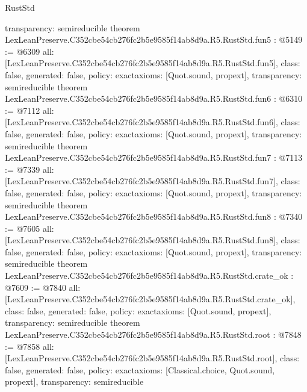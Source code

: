 \begin{lexlean}{RustStd}
\begin{coremodule}
{  transparency: semireducible
}
theorem LexLeanPreserve.C352cbe54cb276fc2b5e9585f14ab8d9a.R5.RustStd.fun5 : @5149 := @6309 {
  all: [LexLeanPreserve.C352cbe54cb276fc2b5e9585f14ab8d9a.R5.RustStd.fun5],
  class: false,
  generated: false,
  policy: exact{axioms: [Quot.sound, propext]},
  transparency: semireducible
}
theorem LexLeanPreserve.C352cbe54cb276fc2b5e9585f14ab8d9a.R5.RustStd.fun6 : @6310 := @7112 {
  all: [LexLeanPreserve.C352cbe54cb276fc2b5e9585f14ab8d9a.R5.RustStd.fun6],
  class: false,
  generated: false,
  policy: exact{axioms: [Quot.sound, propext]},
  transparency: semireducible
}
theorem LexLeanPreserve.C352cbe54cb276fc2b5e9585f14ab8d9a.R5.RustStd.fun7 : @7113 := @7339 {
  all: [LexLeanPreserve.C352cbe54cb276fc2b5e9585f14ab8d9a.R5.RustStd.fun7],
  class: false,
  generated: false,
  policy: exact{axioms: [Quot.sound, propext]},
  transparency: semireducible
}
theorem LexLeanPreserve.C352cbe54cb276fc2b5e9585f14ab8d9a.R5.RustStd.fun8 : @7340 := @7605 {
  all: [LexLeanPreserve.C352cbe54cb276fc2b5e9585f14ab8d9a.R5.RustStd.fun8],
  class: false,
  generated: false,
  policy: exact{axioms: [Quot.sound, propext]},
  transparency: semireducible
}
theorem LexLeanPreserve.C352cbe54cb276fc2b5e9585f14ab8d9a.R5.RustStd.crate_ok : @7609 := @7840 {
  all: [LexLeanPreserve.C352cbe54cb276fc2b5e9585f14ab8d9a.R5.RustStd.crate_ok],
  class: false,
  generated: false,
  policy: exact{axioms: [Quot.sound, propext]},
  transparency: semireducible
}
theorem LexLeanPreserve.C352cbe54cb276fc2b5e9585f14ab8d9a.R5.RustStd.root : @7848 := @7858 {
  all: [LexLeanPreserve.C352cbe54cb276fc2b5e9585f14ab8d9a.R5.RustStd.root],
  class: false,
  generated: false,
  policy: exact{axioms: [Classical.choice, Quot.sound, propext]},
  transparency: semireducible
}


\end{coremodule}
\end{lexlean}
